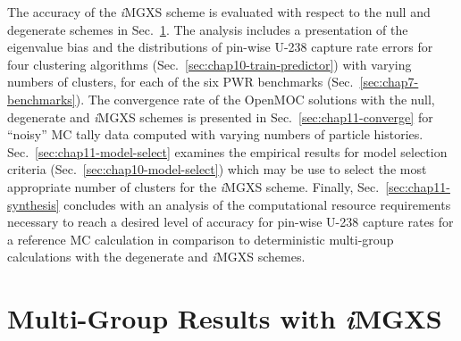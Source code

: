 The accuracy of the \textit{i}\ac{MGXS} scheme is evaluated with respect to the null and degenerate schemes in Sec.~\ref{subsec:chap11-imgxs-results}. The analysis includes a presentation of the eigenvalue bias and the distributions of pin-wise U-238 capture rate errors for four clustering algorithms (Sec.~\ref{sec:chap10-train-predictor}) with varying numbers of clusters, for each of the six \ac{PWR} benchmarks (Sec.~\ref{sec:chap7-benchmarks}). The convergence rate of the OpenMOC solutions with the null, degenerate and \textit{i}\ac{MGXS} schemes is presented in Sec.~\ref{sec:chap11-converge} for ``noisy'' \ac{MC} tally data computed with varying numbers of particle histories. Sec.~\ref{sec:chap11-model-select} examines the empirical results for model selection criteria (Sec.~\ref{sec:chap10-model-select}) which may be use to select the most appropriate number of clusters for the \textit{i}\ac{MGXS} scheme. Finally, Sec.~\ref{sec:chap11-synthesis} concludes with an analysis of the computational resource requirements necessary to reach a desired level of accuracy for pin-wise U-238 capture rates for a reference \ac{MC} calculation in comparison to deterministic multi-group calculations with the degenerate and \textit{i}\ac{MGXS} schemes.


\section{Multi-Group Results with \textit{i}MGXS}
\label{subsec:chap11-imgxs-results}

